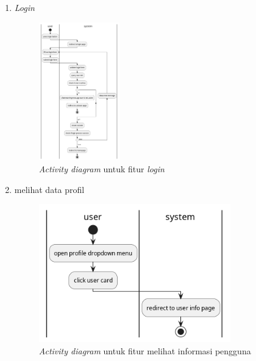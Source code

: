 \documentclass[a4paper]{article}
\begin{document}
\begin{enumerate}
\begin{enumerate}
        \item \textit{Login}\\
        \begin{figure}[h]
            \centering
            \includegraphics*[height=6cm]{diagram/activity diagram/3. login/login.png}
            \caption{\textit{Activity diagram} untuk fitur \textit{login}}
        \end{figure}
        \item melihat data profil\\
        \begin{figure}[h]
            \centering
            \includegraphics*[height=6cm]{diagram/activity diagram/4. see user info/see user info.png}
            \caption{\textit{Activity diagram} untuk fitur melihat informasi pengguna}
        \end{figure}
        \newpage


\end{enumerate}
\end{enumerate}
\end{document}
